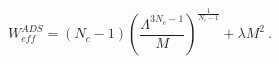 \begin{equation}
W_{eff}^{ADS}=\left(N_c-1 \right)\left(\frac{\Lambda^{3N_c-1}}{M} 
\right)^{\frac{1}{N_c-1}} + \lambda M^2 ~.
\end{equation}

